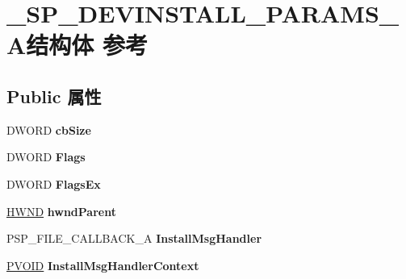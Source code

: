 \hypertarget{struct___s_p___d_e_v_i_n_s_t_a_l_l___p_a_r_a_m_s___a}{}\section{\+\_\+\+S\+P\+\_\+\+D\+E\+V\+I\+N\+S\+T\+A\+L\+L\+\_\+\+P\+A\+R\+A\+M\+S\+\_\+\+A结构体 参考}
\label{struct___s_p___d_e_v_i_n_s_t_a_l_l___p_a_r_a_m_s___a}
\subsection*{Public 属性}
\begin{DoxyCompactItemize}
\item 
\mbox{\label{struct___s_p___d_e_v_i_n_s_t_a_l_l___p_a_r_a_m_s___a_af3baf793b85d06a3b80b06962f036423}} 
D\+W\+O\+RD {\bfseries cb\+Size}
\item 
\mbox{\label{struct___s_p___d_e_v_i_n_s_t_a_l_l___p_a_r_a_m_s___a_a84c703d5ceaedfd44a4ac28502767592}} 
D\+W\+O\+RD {\bfseries Flags}
\item 
\mbox{\label{struct___s_p___d_e_v_i_n_s_t_a_l_l___p_a_r_a_m_s___a_af352a0bf51f3c3eca957c3423b2e53b1}} 
D\+W\+O\+RD {\bfseries Flags\+Ex}
\item 
\mbox{\label{struct___s_p___d_e_v_i_n_s_t_a_l_l___p_a_r_a_m_s___a_af3521113d89e847a1c0bb9f8cf1ecd41}} 
\hyperlink{interfacevoid}{H\+W\+ND} {\bfseries hwnd\+Parent}
\item 
\mbox{\label{struct___s_p___d_e_v_i_n_s_t_a_l_l___p_a_r_a_m_s___a_ad20876abab4cfaa058b3d3cdf290e1f8}} 
P\+S\+P\+\_\+\+F\+I\+L\+E\+\_\+\+C\+A\+L\+L\+B\+A\+C\+K\+\_\+A {\bfseries Install\+Msg\+Handler}
\item 
\mbox{\label{struct___s_p___d_e_v_i_n_s_t_a_l_l___p_a_r_a_m_s___a_ab0112c911ecae650e97c4346a69d735c}} 
\hyperlink{interfacevoid}{P\+V\+O\+ID} {\bfseries Install\+Msg\+Handler\+Context}

\end{DoxyCompactItemize}
